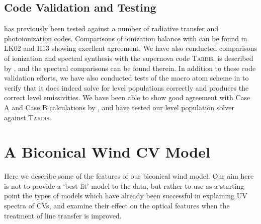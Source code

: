 \documentclass[preprint, a4paper, 11pt]{aastex}
\begin{document}
\subsection{Code Validation and Testing}

\py has previously been tested against a number of radiative transfer and
photoionization codes. Comparisons of ionization balance with \cld \citep{cloudy2013} 
can be found in LK02 and H13 showing excellent agreement. We have also conducted comparisons
of ionization and spectral synthesis with the supernova code \textsc{Tardis.} \tar is described by
\cite{kerzendorfsim}, and the spectral comparisons can be found therein.
In addition to these code validation efforts, we have also conducted tests of
the macro atom scheme in \py to verify that it does indeed solve for level populations correctly
and produces the correct level emissivities. We have been able to show good agreement with 
Case A and Case B calculations by \cite{seaton1959}, and have tested our level
population solver against \textsc{Tardis.}




%
%

\section{A Biconical Wind CV Model}

Here we describe some of the features of our biconical wind model. Our aim here is not
to provide a `best fit' model to the data, but rather to use as a starting point
the types of models which have already been successful in explaining UV spectra of CVs,
and examine their effect on the optical features when the treatment of line transfer
is improved.
\end{document}
